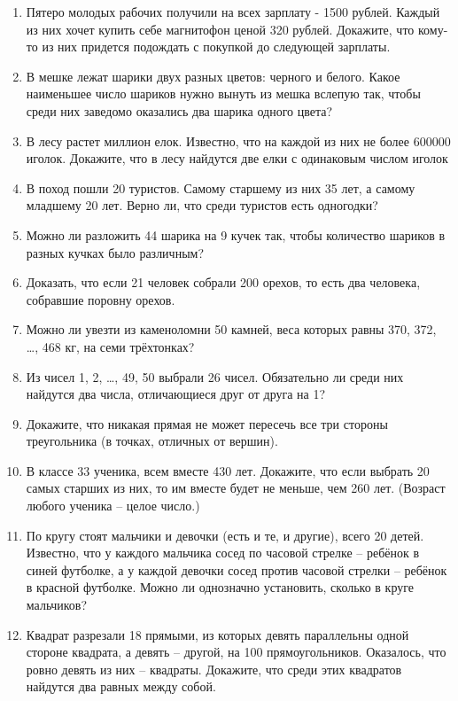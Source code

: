 \documentclass{article}
\begin{document}
\begin{enumerate}[label*=\protect\fbox{\arabic{enumi}}]
		\item Пятеро молодых рабочих получили на всех зарплату - 1500 рублей. Каждый из них хочет купить себе магнитофон ценой 320 рублей. Докажите, что кому-то из них придется подождать с покупкой до следующей зарплаты.
		
		\item В мешке лежат шарики двух разных цветов: черного и белого. Какое наименьшее число шариков нужно вынуть из мешка вслепую так, чтобы среди них заведомо оказались два шарика одного цвета?
		
		\item В лесу растет миллион елок. Известно, что на каждой из них не более 600000 иголок. Докажите, что в лесу найдутся две елки с одинаковым числом иголок
		
		\item В поход пошли 20 туристов. Самому старшему из них 35 лет, а самому младшему 20 лет. Верно ли, что среди туристов есть одногодки?
		
		\item Можно ли разложить 44 шарика на 9 кучек так, чтобы количество шариков в разных кучках было различным?
		
		\item Доказать, что если 21 человек собрали 200 орехов, то есть два человека, собравшие поровну орехов.
		
		\item Можно ли увезти из каменоломни 50 камней, веса которых равны 370, 372, \dots,  468 кг, на семи трёхтонках?
		
		\item Из чисел 1, 2, \dots , 49, 50 выбрали 26 чисел. Обязательно ли среди них найдутся два числа, отличающиеся друг от друга на 1?
		
		\item Докажите, что никакая прямая не может пересечь все три стороны треугольника (в точках, отличных от вершин).
		
		\item В классе 33 ученика, всем вместе 430 лет. Докажите, что если выбрать 20 самых старших из них, то им вместе будет не меньше, чем 260 лет. (Возраст любого ученика – целое число.)
		
		\item По кругу стоят мальчики и девочки (есть и те, и другие), всего 20 детей. Известно, что у каждого мальчика сосед по часовой стрелке – ребёнок в синей футболке, а у каждой девочки сосед против часовой стрелки – ребёнок в красной футболке. Можно ли однозначно установить, сколько в круге мальчиков?
		
		\item Квадрат разрезали 18 прямыми, из которых девять параллельны одной стороне квадрата, а девять – другой, на 100 прямоугольников. Оказалось, что ровно девять из них – квадраты. Докажите, что среди этих квадратов найдутся два равных между собой.
		
		
		
		
	\end{enumerate}
\end{document}
